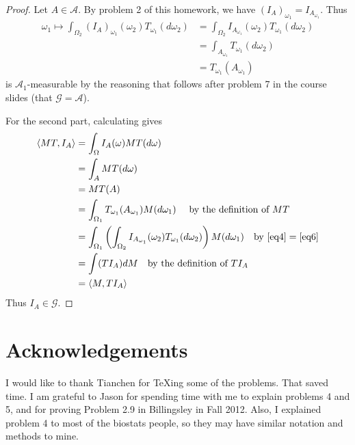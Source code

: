 \documentclass[letterpaper, 12pt]{article}
\newcommand{\cA}{\mathcal{A}}
\newcommand{\cG}{\mathcal{G}}
\newcommand{\sG}{\mathscr{G}}
\begin{document}
\begin{enumerate}
\begin{proof}
Let $A \in \cA$.
By problem 2 of this homework, we have $(I_A)_{\omega_1} = I_{A_{\omega_1}}$. Thus
\begin{align}
\omega_1 \mapsto
\int_{\Omega_2} (I_A)_{\omega_1}(\omega_2) T_{\omega_1}(d\omega_2)
&= \int_{\Omega_2} I_{A_{\omega_1}}(\omega_2) T_{\omega_1}(d\omega_2) \label{eq4} \\
&= \int_{A_{\omega_1}} T_{\omega_1} (d \omega_2) \\
&= T_{\omega_1} (A_{\omega_1}) \label{eq6}
\end{align}
is $\cA_1$-measurable by the reasoning that follows after problem 7 in the course slides (that $\sG = \cA$).

For the second part, calculating gives
\begin{align*}
\langle MT, I_A \rangle 
&= \int_{\Omega} I_A(\omega) MT(d\omega) \\
&= \int_A MT(d \omega) \\
&= MT(A) \\
&= \int_{\Omega_1} T_{\omega_1} (A_{\omega_1}) M (d \omega_1)
\quad \text{ by the definition of $MT$} \\
&= \int_{\Omega_1} \left( \int_{\Omega_2} I_{A_{\omega_1}}(\omega_2) T_{\omega_1}(d\omega_2) \right) M (d \omega_1)
\quad \text{by $\eqref{eq4} = \eqref{eq6}$}\\
&= \int (TI_A) dM 
\quad \text{by the definition of $TI_A$}\\
&= \langle M, TI_A \rangle
\end{align*}
Thus $I_A \in \cG$.
\end{proof}

\end{enumerate}

\section*{Acknowledgements}
I would like to thank Tianchen for TeXing some of the problems. That saved time. I am grateful to Jason for spending time with me to explain problems 4 and 5, and for proving Problem 2.9 in Billingsley in Fall 2012. Also, I explained problem 4 to most of the biostats people, so they may have similar notation and methods to mine.
\end{document}
